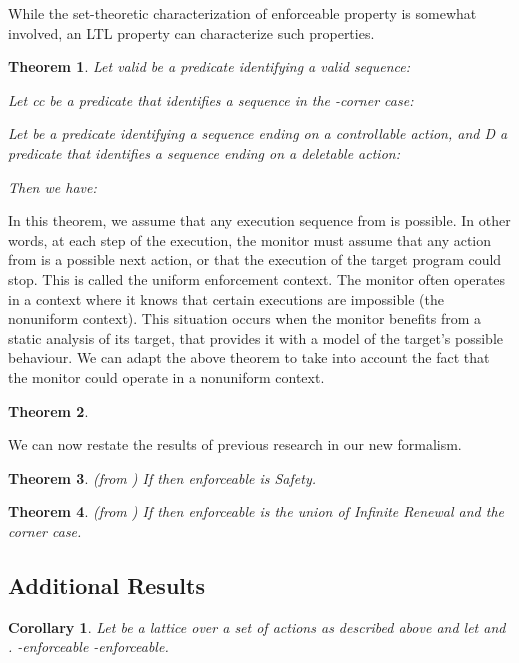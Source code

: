 \documentclass[12pt]{article}
\newtheorem{thm}{Theorem}
\newtheorem{cor}{Corollary}
\begin{document}
While the set-theoretic characterization of enforceable property is somewhat involved, an LTL property can characterize such properties.

\begin{thm}
Let \textit{valid} be a predicate identifying a valid sequence:

Let \textit{cc} be a predicate that identifies a sequence in the -corner case:

Let  be a predicate identifying a sequence ending on a controllable action, and \textit{D} a predicate that identifies a sequence ending on a deletable action:

Then we have:

\end{thm}



In this theorem, we assume that any execution sequence from  is possible. In other words, at each step of the execution, the monitor must assume that any action from  is a possible next action, or that the execution of the target program could stop. This is called the uniform enforcement context. The monitor often operates in a context where it knows that certain executions are impossible (the nonuniform context).
This situation occurs when the monitor benefits from a static analysis of its target, that provides it with a model of the target's possible behaviour.  We can adapt the above theorem to take into account the fact that the monitor could operate in a nonuniform context.

\begin{thm}

\end{thm}


We can now restate the results of previous research in our new formalism.
\begin{thm}
(from \cite{enforceable}) If  then enforceable is  Safety.
\end{thm}



\begin{thm}
(from \cite{nonsafetyJournal}) If  then enforceable is the union of Infinite Renewal  and the corner case.
\end{thm}


\subsection{Additional Results}
\begin{cor}\label{corr:1}
Let  be a lattice over a set of actions  as described above and let  and .
-enforceable    -enforceable.
\end{cor}
\end{document}
